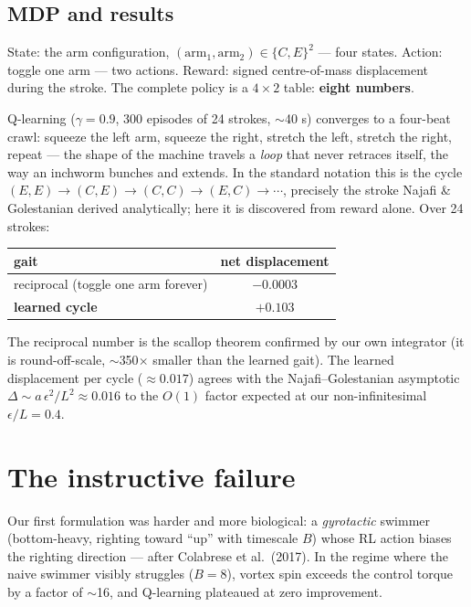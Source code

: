 \documentclass[11pt]{article}
\begin{document}
\subsection{MDP and results}

State: the arm configuration, $(\text{arm}_1, \text{arm}_2) \in \{C, E\}^2$ --- four
states. Action: toggle one arm --- two actions. Reward: signed centre-of-mass
displacement during the stroke. The complete policy is a $4\times2$ table:
\textbf{eight numbers}.

Q-learning ($\gamma = 0.9$, 300 episodes of 24 strokes, $\sim$40 s) converges to a
four-beat crawl: squeeze the left arm, squeeze the right, stretch the left, stretch the
right, repeat --- the shape of the machine travels a \emph{loop} that never retraces
itself, the way an inchworm bunches and extends. In the standard notation this is the cycle
$(E,E) \to (C,E) \to (C,C) \to (E,C) \to \cdots$, precisely the stroke Najafi \&
Golestanian derived analytically; here it is discovered from reward alone. Over 24
strokes:

\begin{center}
\begin{tabular}{lc}
\toprule
gait & net displacement \\
\midrule
reciprocal (toggle one arm forever) & $-0.0003$ \\
\textbf{learned cycle} & $\mathbf{+0.103}$ \\
\bottomrule
\end{tabular}
\end{center}

The reciprocal number is the scallop theorem confirmed by our own integrator (it is
round-off-scale, $\sim$350$\times$ smaller than the learned gait). The learned
displacement per cycle ($\approx 0.017$) agrees with the Najafi--Golestanian asymptotic
$\Delta \sim a\,\epsilon^2/L^2 \approx 0.016$ to the $O(1)$ factor expected at our
non-infinitesimal $\epsilon/L = 0.4$.

\section{The instructive failure}

Our first formulation was harder and more biological: a \emph{gyrotactic} swimmer
(bottom-heavy, righting toward ``up'' with timescale $B$) whose RL action biases the
righting direction --- after Colabrese et al.\ (2017). In the regime where the naive
swimmer visibly struggles ($B = 8$), vortex spin exceeds the control torque by a factor
of $\sim$16, and Q-learning plateaued at zero improvement.
\end{document}
